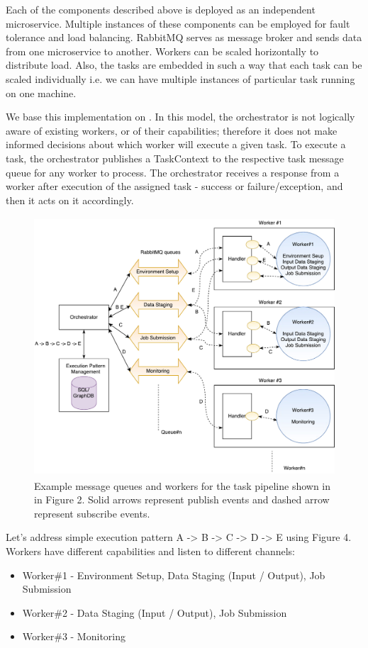 \documentclass[review]{elsarticle}
\begin{document}
Each of the components described above is deployed as an independent microservice. Multiple instances of these components can be employed for fault tolerance and load balancing. RabbitMQ serves as message broker and sends data from one microservice to another.  Workers can be scaled horizontally to distribute load. Also, the tasks are embedded in such a way that each task can be scaled individually i.e. we can have multiple instances of particular task running on one machine. 

We base this implementation on \cite{sadooghi2014achieving}. In this model, the orchestrator is not logically aware of existing workers, or of their capabilities; therefore it does not make informed decisions about which worker will execute a given task.  To execute a task, the orchestrator publishes a TaskContext to the respective task message queue for any worker to process. The orchestrator receives a response from a worker after execution of the assigned task - success or failure/exception, and then it acts on it accordingly.  

\begin{figure}
\centering
\includegraphics[height=3.8in, width=4.8 in]{figures/figure4.pdf}
\caption{Example message queues and workers for the task pipeline shown in in Figure 2. Solid arrows represent publish events and dashed arrow represent subscribe events.}
\end{figure}

Let's address simple execution pattern A -> B -> C -> D -> E using Figure 4.  Workers have different capabilities and listen to different channels:
\begin{itemize}
\item Worker\#1 - Environment Setup, Data Staging (Input / Output), Job Submission
\item Worker\#2 - Data Staging (Input / Output), Job Submission
\item Worker\#3 - Monitoring
\end{itemize}
\end{document}
